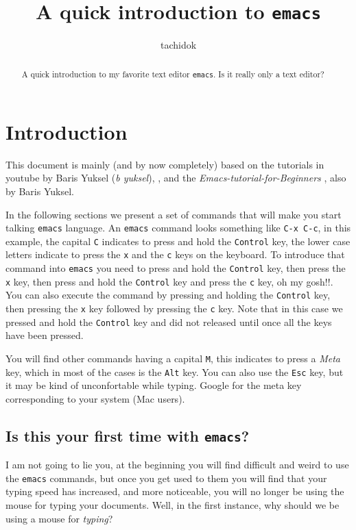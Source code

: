 \documentclass[12pt,a4paper,final]{article} %
\author{tachidok}
\title{A quick introduction to \texttt{emacs}}
\date{}
\begin{document}
\maketitle

\begin{abstract}
  A quick introduction to my favorite text editor \texttt{emacs}. Is
  it really only a text editor?
\end{abstract}



\section{Introduction}
This document is mainly (and by now completely) based on the tutorials
in youtube by Baris Yuksel (\textit{b yuksel}),
\cite{emacs_video_01:URL, emacs_video_02:URL}, and the
\textit{Emacs-tutorial-for-Beginners} \cite{emacs_github:URL}, also by
Baris Yuksel.

In the following sections we present a set of commands that will make
you start talking \texttt{emacs} language. An \texttt{emacs} command
looks something like \texttt{C-x C-c}, in this example, the capital
\texttt{C} indicates to press and hold the \texttt{Control} key, the
lower case letters indicate to press the \texttt{x} and the \texttt{c}
keys on the keyboard. To introduce that command into \texttt{emacs}
you need to press and hold the \texttt{Control} key, then press the
\texttt{x} key, then press and hold the \texttt{Control} key and press
the \texttt{c} key, oh my gosh!!. You can also execute the command by
pressing and holding the \texttt{Control} key, then pressing the
\texttt{x} key followed by pressing the \texttt{c} key. Note that in
this case we pressed and hold the \texttt{Control} key and did not
released until once all the keys have been pressed.

You will find other commands having a capital \texttt{M}, this
indicates to press a \textit{Meta} key, which in most of the cases is
the \texttt{Alt} key. You can also use the \texttt{Esc} key, but it
may be kind of unconfortable while typing. Google for the meta key
corresponding to your system (Mac users).

\subsection{Is this your first time with \texttt{emacs}?}
I am not going to lie you, at the beginning you will find difficult
and weird to use the \texttt{emacs} commands, but once you get used to
them you will find that your typing speed has increased, and more
noticeable, you will no longer be using the mouse for typing your
documents. Well, in the first instance, why should we be using a mouse
for \textit{typing}?
\end{document}
